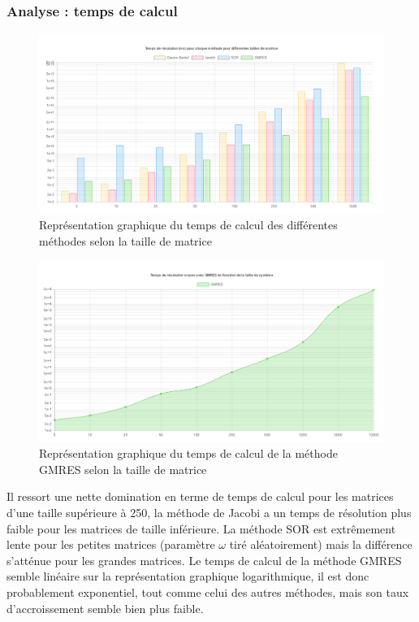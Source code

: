 \subsubsection{Analyse : temps de calcul}
\begin{figure}[H]
	\includegraphics[width=\linewidth]{images/times.PNG}
	\caption{Représentation graphique du temps de calcul des différentes méthodes selon la taille de matrice}
\end{figure}
\begin{figure}[H]
	\includegraphics[width=\linewidth]{images/timeGMRES.PNG}
	\caption{Représentation graphique du temps de calcul de la méthode GMRES selon la taille de matrice}
\end{figure}

Il ressort une nette domination en terme de temps de calcul pour les matrices d'une taille supérieure à 250, la méthode de Jacobi a un temps de résolution plus faible pour les matrices de taille inférieure. La méthode SOR est extrêmement lente pour les petites matrices (paramètre $\omega$ tiré aléatoirement) mais la différence s'atténue pour les grandes matrices. Le temps de calcul de la méthode GMRES semble linéaire sur 
la représentation graphique logarithmique, il est donc probablement exponentiel, tout comme celui des autres méthodes, mais son taux d'accroissement semble bien plus faible.
